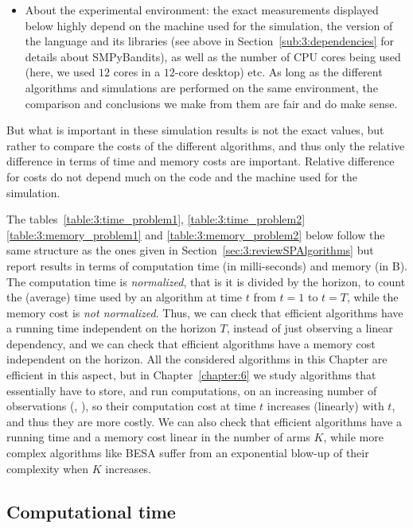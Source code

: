 {\begin{itemize}
    \item About the experimental environment:
    the exact measurements displayed below highly depend on the machine used for the simulation, the version of the language and its libraries (see above in Section~\ref{sub:3:dependencies} for details about SMPyBandits), as well as the number of CPU cores being used (here, we used $12$ cores in a $12$-core desktop) etc.
    As long as the different algorithms and simulations are performed on the same environment, the comparison and conclusions we make from them are fair and do make sense.
\end{itemize}

But what is important in these simulation results is not the exact values, but rather to compare the costs of the different algorithms, and thus only the relative difference in terms of time and memory costs are important.
Relative difference for costs do not depend much on the code and the machine used for the simulation.

The tables~\ref{table:3:time_problem1}, \ref{table:3:time_problem2} \ref{table:3:memory_problem1} and \ref{table:3:memory_problem2} below follow the same structure as the ones given in Section~\ref{sec:3:reviewSPAlgorithms} but report results in terms of computation time (in milli-seconds) and memory (in B).
The computation time is \emph{normalized}, that is it is divided by the horizon, to count the (average) time used by an algorithm at time $t$ from $t=1$ to $t=T$, while the memory cost is \emph{not normalized}.
%
Thus, we can check that efficient algorithms have a running time independent on the horizon $T$, instead of just observing a linear dependency, and we can check that efficient algorithms have a memory cost independent on the horizon.
All the considered algorithms in this Chapter are efficient in this aspect, but in Chapter~\ref{chapter:6} we study algorithms that essentially have to store, and run computations, on an increasing number of observations (\eg, \CUSUMUCB), so their computation cost at time $t$ increases (linearly) with $t$, and thus they are more costly.
%
We can also check that efficient algorithms have a running time and a memory cost linear in the number of arms $K$, while more complex algorithms like BESA suffer from an exponential blow-up of their complexity when $K$ increases.


\subsection{Computational time}

}
